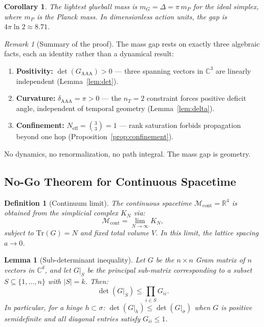 \documentclass[12pt]{article}
\newtheorem{lemma}[theorem]{Lemma}
\newtheorem{corollary}[theorem]{Corollary}
\newtheorem{definition}[theorem]{Definition}
\theoremstyle{remark}
\newtheorem{remark}[theorem]{Remark}
\theoremstyle{definition}
\newcommand{\CC}{\mathbb{C}}
\newcommand{\RR}{\mathbb{R}}
\begin{document}
\begin{corollary}
The lightest glueball mass is $m_G = \Delta = \pi\, m_P$ for the
ideal simplex, where $m_P$ is the Planck mass.  In dimensionless
action units, the gap is $4\pi\ln 2 \approx 8.71$.
\end{corollary}

\begin{remark}[Summary of the proof]
The mass gap rests on exactly three algebraic facts, each an identity
rather than a dynamical result:
\begin{enumerate}
\item[(i)] \textbf{Positivity:} $\det(G_{\mathrm{AAA}}) > 0$ --- three
  spanning vectors in $\CC^3$ are linearly independent
  (Lemma~\ref{lem:det}).
\item[(ii)] \textbf{Curvature:} $\delta_{\mathrm{AAA}} = \pi > 0$ ---
  the $n_T = 2$ constraint forces positive deficit angle, independent
  of temporal geometry (Lemma~\ref{lem:delta}).
\item[(iii)] \textbf{Confinement:} $N_{\mathrm{eff}} = \binom{3}{3} = 1$
  --- rank saturation forbids propagation beyond one hop
  (Proposition~\ref{prop:confinement}).
\end{enumerate}
No dynamics, no renormalization, no path integral.  The mass gap is
geometry.
\end{remark}

\subsection{No-Go Theorem for Continuous Spacetime}
\label{sec:nogo}

\begin{definition}[Continuum limit]
\label{def:continuum}
The continuous spacetime $\mathcal{M}_{\mathrm{cont}} = \RR^4$ is
obtained from the simplicial complex $K_N$ via:
\begin{equation}
\mathcal{M}_{\mathrm{cont}} = \lim_{N \to \infty} K_N,
\end{equation}
subject to $\mathrm{Tr}(G) = N$ and fixed total volume $V$.
In this limit, the lattice spacing $a \to 0$.
\end{definition}

\begin{lemma}[Sub-determinant inequality]
\label{lem:subdet}
Let $G$ be the $n \times n$ Gram matrix of $n$ vectors in $\CC^d$,
and let $G|_S$ be the principal sub-matrix corresponding to a subset
$S \subseteq \{1, \ldots, n\}$ with $|S| = k$.  Then:
\begin{equation}
\det(G|_S) \leq \prod_{i \in S} G_{ii}.
\end{equation}
In particular, for a hinge $h \subset \sigma$:
$\det(G|_h) \leq \det(G|_\sigma)$ when $G$ is positive semidefinite
and all diagonal entries satisfy $G_{ii} \leq 1$.
\end{lemma}
\end{document}
